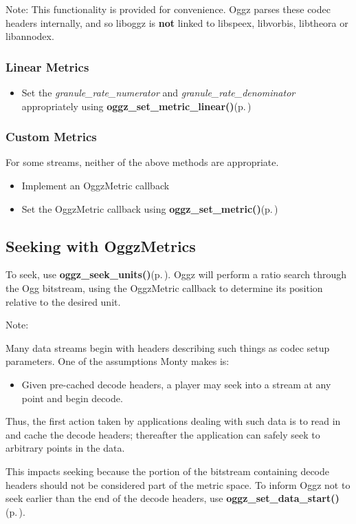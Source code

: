 \begin{Desc}
\item[Note:]This functionality is provided for convenience. Oggz parses these codec headers internally, and so liboggz is {\bf not} linked to libspeex, libvorbis, libtheora or libannodex.\end{Desc}
\subsubsection{Linear Metrics}\label{linear}
\begin{itemize}
\item Set the {\em granule\_\-rate\_\-numerator\/} and {\em granule\_\-rate\_\-denominator\/} appropriately using {\bf oggz\_\-set\_\-metric\_\-linear()}{\rm (p.\,\pageref{group__seek__api_a1})}\end{itemize}
\subsubsection{Custom Metrics}\label{custom}
For some streams, neither of the above methods are appropriate.

\begin{itemize}
\item Implement an Oggz\-Metric callback\item Set the Oggz\-Metric callback using {\bf oggz\_\-set\_\-metric()}{\rm (p.\,\pageref{group__seek__api_a2})}\end{itemize}
\subsection{Seeking with Oggz\-Metrics}\label{using}
To seek, use {\bf oggz\_\-seek\_\-units()}{\rm (p.\,\pageref{group__seek__api_a3})}. Oggz will perform a ratio search through the Ogg bitstream, using the Oggz\-Metric callback to determine its position relative to the desired unit.

\begin{Desc}
\item[Note:]\end{Desc}
Many data streams begin with headers describing such things as codec setup parameters. One of the assumptions Monty makes is:

\begin{itemize}
\item Given pre-cached decode headers, a player may seek into a stream at any point and begin decode.\end{itemize}


Thus, the first action taken by applications dealing with such data is to read in and cache the decode headers; thereafter the application can safely seek to arbitrary points in the data.

This impacts seeking because the portion of the bitstream containing decode headers should not be considered part of the metric space. To inform Oggz not to seek earlier than the end of the decode headers, use {\bf oggz\_\-set\_\-data\_\-start()}{\rm (p.\,\pageref{group__seek__api_a4})}. 

